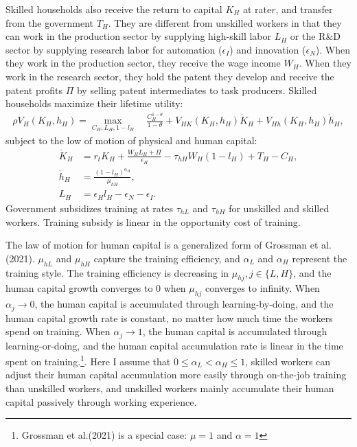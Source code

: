 \documentclass[12pt]{article}
\begin{document}
Skilled households also receive the return to capital $K_H$ at rate$r$, and transfer from the government $T_H$. They are different from unskilled workers in that they can work in the production sector by supplying high-skill labor $L_H$ or the R\&D sector by supplying research labor for automation ($\epsilon_I$) and innovation ($\epsilon_N$). When they work in the production sector, they receive the wage income $W_H$. When they work in the research sector, they hold the patent they develop and receive the patent profits $\Pi$ by selling patent intermediates to task producers. Skilled households maximize their lifetime utility: 
\begin{align*}
\rho V_H(K_H,h_H) = \max_{C_H,L_H,1-l_H} \quad \frac{C_H^{1-\theta}}{1-\theta}+V_{HK}(K_H,h_H)\dot{K}_H+V_{Hh}(K_H,h_H)\dot{h}_H,
\end{align*}
subject to the low of motion of physical and human capital: 
\begin{align*}
\dot{K}_H &= r_t K_H +\frac{W_H L_H+\Pi}{\epsilon_H}-\tau_{hH}W_H(1-l_H)+T_H-C_H, \\
\dot{h}_H &= \frac{(1-l_H)^{\alpha_H}}{\mu_{hH}}, \\
 L_H&=\epsilon_H l_H-\epsilon_N-\epsilon_I.
\end{align*}
Government subsidizes training at rates $\tau_{hL}$ and $\tau_{hH}$ for unskilled and skilled workers. Training subsidy is linear in the opportunity cost of training. 

The law of motion for human capital is a generalized form of Grossman et al.(2021)\nocite{Grossmanetal2021}. $\mu_{hL}$ and $\mu_{hH}$ capture the training efficiency, and $\alpha_L$ and $\alpha_H$ represent the training style. The training efficiency is decreasing in $\mu_{hj}, j\in\{L,H\}$, and the human capital growth converges to 0 when $\mu_{hj}$ converges to infinity. When $\alpha_j \to 0$, the human capital is accumulated through learning-by-doing, and the human capital growth rate is constant, no matter how much time the workers spend on training. When $\alpha_j \to 1$, the human capital is accumulated through learning-or-doing, and the human capital accumulation rate is linear in the time spent on training.\footnote{Grossman et al.(2021) is a special case: $\mu = 1$ and $\alpha=1$}. Here I assume that $0\leq\alpha_L<\alpha_H\leq1$, skilled workers can adjust their human capital accumulation more easily through on-the-job training than unskilled workers, and unskilled workers mainly accumulate their human capital passively through working experience. 
\end{document}
